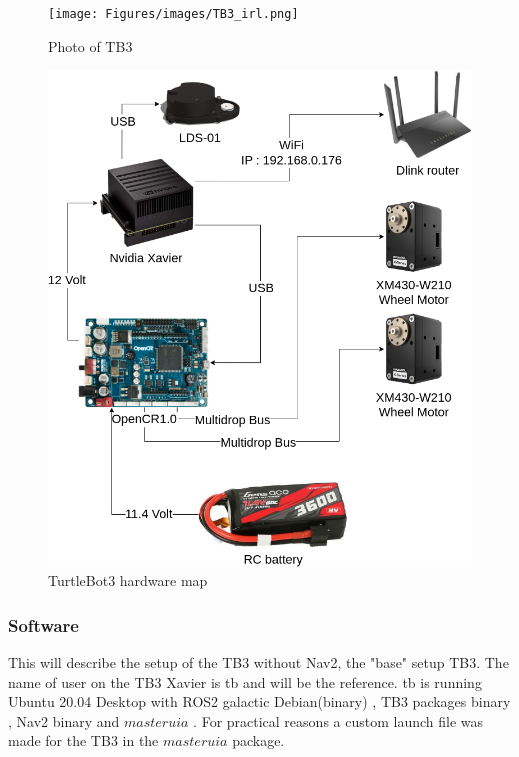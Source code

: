 \begin{figure}[H]
  \centering
  \begin{minipage}[b]{0.4\textwidth}
    \texttt{[image: Figures/images/TB3\_irl.png]}
    \caption{Photo of TB3}
    \label{fig:TB3_irl}
  \end{minipage}
  \hfill
  \begin{minipage}[b]{0.59\textwidth}
    \includegraphics[width=\textwidth]{Figures/drawio/TB3_HW.drawio.png}
    \caption{TurtleBot3 hardware map}
    \label{fig:TB3HW}
  \end{minipage}
\end{figure}


\subsubsection{Software}

This will describe the setup of the TB3 without Nav2, the "base" setup TB3.  
The name of user on the TB3 Xavier is tb and will be the reference. tb is running Ubuntu 20.04 Desktop \cite{ubuntu20_04} with ROS2 galactic Debian(binary) \cite{rosgalacticinstall}, TB3 packages binary \cite{turtlebot3galactic}, Nav2 binary \cite{rosnavinstall} and $masteruia$ \cite{masteruia}. For practical reasons a custom launch file was made for the TB3 in the $masteruia$ package. 

